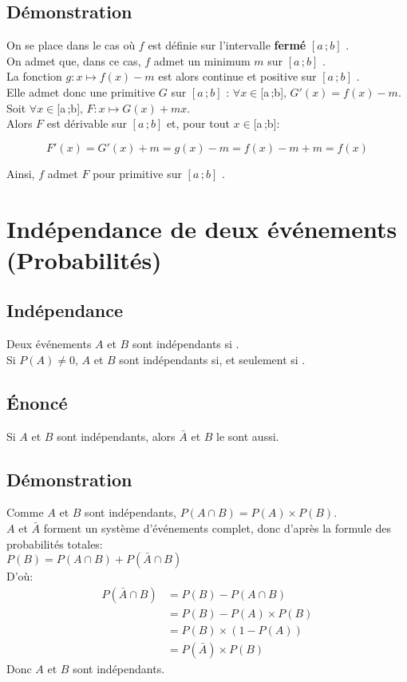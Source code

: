 \documentclass[12px]{article}
\newcommand\I{$[a\,;b]$ }
\begin{document}
	\subsection{Démonstration}
	On se place dans le cas où $f$ est définie sur l'intervalle \textbf{fermé} \I.\\
	On admet que, dans ce cas, $f$ admet un minimum $m$ sur \I.\\
	La fonction $g:x\mapsto f(x)-m$ est alors continue et positive sur \I.\\
	Elle admet donc une primitive $G$ sur \I : $\forall x \in \I, \, G'(x) = f(x) -m$.\\
	Soit $\forall x \in \I, \, F: x \mapsto G(x) + mx$.\\
	Alors $F$ est dérivable sur \I et, pour tout $x \in \I$:
	\begin{center}
		\begin{displaymath}
			F'(x) = G'(x) + m = g(x) - m = f(x) -m +m = f(x)
		\end{displaymath}
	\end{center}
	Ainsi, $f$ admet $F$ pour primitive sur \I.
	
	\section{Indépendance de deux événements (Probabilités)}
	
	\subsection{Indépendance}
	Deux événements $A$ et $B$ sont indépendants si .\\
	Si $P(A)\not=0$, $A$ et $B$ sont indépendants si, et seulement si .
	
	\subsection{\'Enoncé}
	Si $A$ et $B$ sont indépendants, alors $\bar{A}$ et $B$ le sont aussi.
	
	\subsection{Démonstration}
	Comme $A$ et $B$ sont indépendants, $P(A\cap B) = P(A)\times P(B)$.\\
	$A$ et $\bar{A}$ forment un système d'événements complet, donc d'après la formule des probabilités totales:\\
	$P(B)= P(A\cap B) + P(\bar{A} \cap B)$\\
	D'où:
	\begin{align*}
	P(\bar{A}\cap B) &= P(B) - P(A\cap B)\\
	&= P(B) - P(A)\times P(B)\\
	&= P(B)\times (1-P(A))\\
	&= P(\bar{A})\times P(B)
	\end{align*}
	Donc $A$ et $B$ sont indépendants.
	
\end{document}
